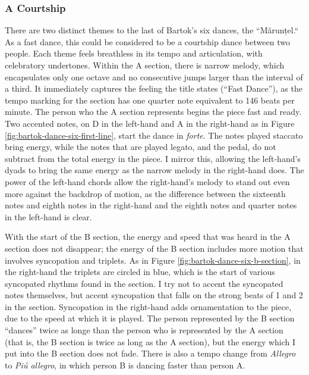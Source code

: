 \subsubsection{A Courtship}

There are two distinct themes to the last of Bartok's six dances, the ``Mărunțel.`` As a fast dance, this could be considered to be a courtship dance between two people. Each theme feels breathless in its tempo and articulation, with celebratory undertones. Within the A section, there is narrow melody, which encapsulates only one octave and no consecutive jumps larger than the interval of a third. It immediately captures the feeling the title states (``Fast Dance''), as the tempo marking for the section has one quarter note equivalent to 146 beats per minute. The person who the A section represents begins the piece fast and ready. Two accented notes, on D in the left-hand and A in the right-hand as in Figure \ref{fig:bartok-dance-six-first-line}\autocite{Lung_2016}, start the dance in \textit{forte}. The notes played staccato bring energy, while the notes that are played legato, and the pedal, do not subtract from the total energy in the piece. I mirror this, allowing the left-hand's dyads to bring the same energy as the narrow melody in the right-hand does. The power of the left-hand chords allow the right-hand's melody to stand out even more against the backdrop of motion, as the difference between the sixteenth notes and eighth notes in the right-hand and the eighth notes and quarter notes in the left-hand is clear. 

With the start of the B section, the energy and speed that was heard in the A section does not disappear; the energy of the B section includes more motion that involves syncopation and triplets. As in Figure \ref{fig:bartok-dance-six-b-section}\autocite{Lung_2016}, in the right-hand the triplets are circled in blue, which is the start of various syncopated rhythms found in the section. I try not to accent the syncopated notes themselves, but accent syncopation that falls on the strong beats of 1 and 2 in the section. Syncopation in the right-hand adds ornamentation to the piece, due to the speed at which it is played. The person represented by the B section ``dances'' twice as longe than the person who is represented by the A section (that is, the B section is twice as long as the A section), but the energy which I put into the B section does not fade. There is also a tempo change from \textit{Allegro} to \textit{Piú allegro}, in which person B is dancing faster than person A.